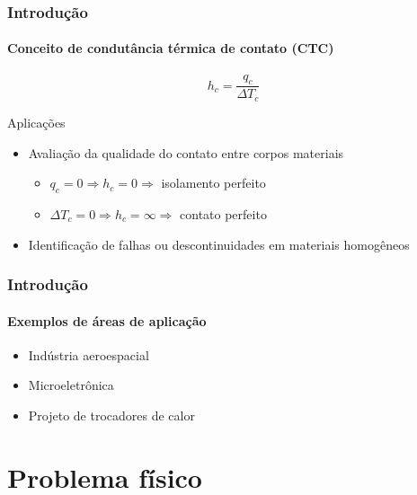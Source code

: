 \documentclass{beamer}
\begin{document}
\begin{frame}
	\frametitle{Introdução}
	\framesubtitle{Conceito de condutância térmica de contato (CTC)}
	
	\begin{definition}{}
		\begin{equation*}
			h_c = \frac{q_c}{\Delta T_c}
		\end{equation*}
	\end{definition}
	
	\begin{alertblock}{Aplicações}
		\begin{itemize}
			\item Avaliação da qualidade do contato entre corpos materiais
			\begin{itemize}
				\item $q_c = 0 \Rightarrow h_c = 0 \Rightarrow$ isolamento perfeito
				\item $\Delta T_c = 0 \Rightarrow h_c = \infty \Rightarrow$ contato perfeito
			\end{itemize}
			\item Identificação de falhas ou descontinuidades em materiais homogêneos			
		\end{itemize}
	\end{alertblock}
\end{frame}

\begin{frame}
	\frametitle{Introdução}
	\framesubtitle{Exemplos de áreas de aplicação}
	\begin{itemize}
		\item Indústria aeroespacial
		\item Microeletrônica
		\item Projeto de trocadores de calor
	\end{itemize}
\end{frame}


\section{Problema físico}
\end{document}
